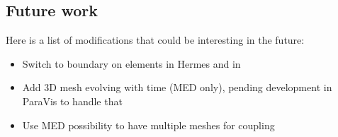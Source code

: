 %
\subsection{Future work}
%
Here is a list of modifications that could be interesting in the future:
\begin{itemize}
\item Switch to boundary on elements in Hermes and in \telemacsystem
\item Add 3D mesh evolving with time (MED only), pending development in
ParaVis to handle that
\item Use MED possibility to have multiple meshes for coupling
\end{itemize}
